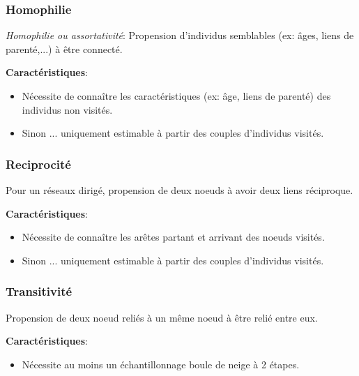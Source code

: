 \documentclass{beamer}
\begin{document}
\begin{frame}
 \frametitle{Homophilie}
 
 {\it Homophilie ou assortativité}: Propension d'individus semblables (ex: âges, liens de parenté,...) à être connecté.
 
 
 \medskip 
 
 {\bf Caractéristiques}: 
 \begin{itemize}
  \item Nécessite de connaître les caractéristiques (ex: âge, liens de parenté) des individus non visités. 
  \item Sinon ... uniquement estimable à partir des couples d'individus visités. 
 \end{itemize}

 
\end{frame}

\begin{frame}
 \frametitle{Reciprocité}
 
 Pour un réseaux dirigé, propension de deux noeuds à avoir deux liens réciproque.   
 
 
 \medskip 
 
 {\bf Caractéristiques}: 
 \begin{itemize}
  \item Nécessite de connaître les arêtes partant et arrivant des noeuds visités. 
  \item Sinon ... uniquement estimable à partir des couples d'individus visités. 
 \end{itemize}

 

 
\end{frame}


\begin{frame}
 \frametitle{Transitivité}
 
 Propension de deux noeud reliés à un même noeud à être relié entre eux. 
 
 
 
 
 \bigskip 
 
 {\bf Caractéristiques}: 
 \begin{itemize}
  \item Nécessite au moins un échantillonnage boule de neige à 2 étapes.
 \end{itemize}
 
 
 
\end{frame}
\end{document}
